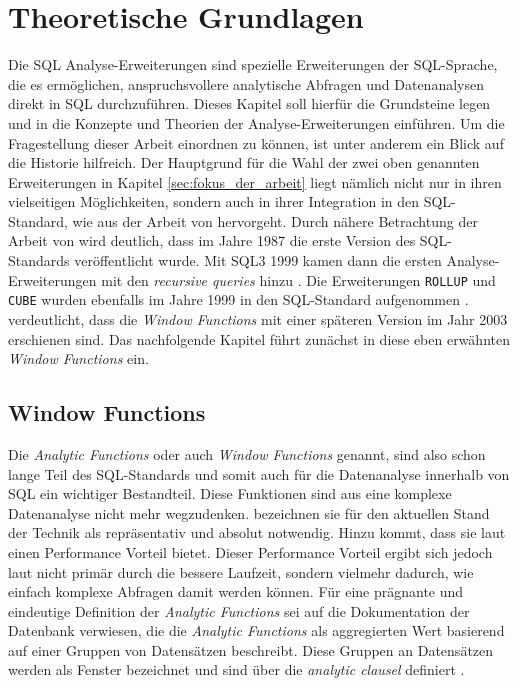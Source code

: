 \chapter{Theoretische Grundlagen}
\label{chap:hintergund_und_grundlagen} Die SQL Analyse-Erweiterungen sind spezielle
Erweiterungen der SQL-Sprache, die es ermöglichen, anspruchsvollere analytische Abfragen
und Datenanalysen direkt in SQL durchzuführen. Dieses Kapitel soll hierfür die
Grundsteine legen und in die Konzepte und Theorien der Analyse-Erweiterungen
einführen. Um die Fragestellung dieser Arbeit einordnen zu können, ist unter
anderem ein Blick auf die Historie hilfreich. Der Hauptgrund für die Wahl der zwei
oben genannten Erweiterungen in Kapitel \ref{sec:fokus_der_arbeit} liegt nämlich
nicht nur in ihren vielseitigen Möglichkeiten, sondern auch in ihrer Integration
in den SQL-Standard, wie aus der Arbeit von \citet[S.~10]{grust2017advanced}
hervorgeht. Durch nähere Betrachtung der Arbeit von \cite{grust2017advanced} wird
deutlich, dass im Jahre 1987 die erste Version des SQL-Standards veröffentlicht
wurde. Mit SQL3 1999 kamen dann die ersten Analyse-Erweiterungen mit den \textit{recursive
queries} hinzu \citep[vgl.][S.~10]{grust2017advanced}. Die Erweiterungen \texttt{ROLLUP}
und \texttt{CUBE} wurden ebenfalls im Jahre 1999 in den SQL-Standard aufgenommen
\citep[vgl.][Kapitel 9.12]{melton2001sql}. \citet[S.~10]{grust2017advanced}
verdeutlicht, dass die \textit{Window Functions} mit einer späteren Version im
Jahr 2003 erschienen sind. Das nachfolgende Kapitel führt zunächst in diese eben
erwähnten \textit{Window Functions} ein.

\section{Window Functions}
\label{sec:window_functions} Die \textit{Analytic Functions} oder auch \textit{Window
Functions} genannt, sind also schon lange Teil des SQL-Standards und somit auch für
die Datenanalyse innerhalb von SQL ein wichtiger Bestandteil. Diese Funktionen
sind aus eine komplexe Datenanalyse nicht mehr wegzudenken. \citet[S. 1244]{cao2012optimization}
bezeichnen sie für den aktuellen Stand der Technik als repräsentativ und absolut
notwendig. Hinzu kommt, dass sie laut \citet[S. 113]{kellenberger2019expert} einen
Performance Vorteil bietet. Dieser Performance Vorteil ergibt sich jedoch laut
\citet{kellenberger2019expert} nicht primär durch die bessere Laufzeit, sondern
vielmehr dadurch, wie einfach komplexe Abfragen damit werden können. Für eine
prägnante und eindeutige Definition der \textit{Analytic Functions} sei auf die Dokumentation
der \citet{oracle} Datenbank verwiesen, die die \textit{Analytic Functions} als
aggregierten Wert basierend auf einer Gruppen von Datensätzen beschreibt. Diese Gruppen
an Datensätzen werden als Fenster bezeichnet und sind über die \textit{analytic
clausel} definiert \citep[vgl.][K. 7]{oracle}.

